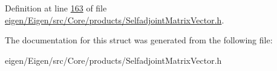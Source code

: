 Definition at line \hyperlink{eigen_2_eigen_2src_2_core_2products_2_selfadjoint_matrix_vector_8h_source_l00163}{163} of file \hyperlink{eigen_2_eigen_2src_2_core_2products_2_selfadjoint_matrix_vector_8h_source}{eigen/\+Eigen/src/\+Core/products/\+Selfadjoint\+Matrix\+Vector.\+h}.



The documentation for this struct was generated from the following file\+:\begin{DoxyCompactItemize}
\item 
eigen/\+Eigen/src/\+Core/products/\+Selfadjoint\+Matrix\+Vector.\+h\end{DoxyCompactItemize}
